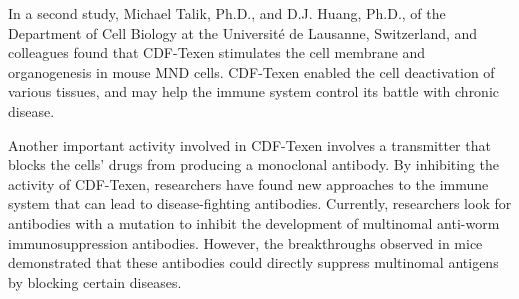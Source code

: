 \documentclass{article}
\begin{document}
In a second study, Michael Talik, Ph.D., and D.J. Huang, Ph.D., of the Department of Cell Biology at the Université de Lausanne, Switzerland, and colleagues found that CDF-Texen stimulates the cell membrane and organogenesis in mouse MND cells. CDF-Texen enabled the cell deactivation of various tissues, and may help the immune system control its battle with chronic disease.

Another important activity involved in CDF-Texen involves a transmitter that blocks the cells’ drugs from producing a monoclonal antibody. By inhibiting the activity of CDF-Texen, researchers have found new approaches to the immune system that can lead to disease-fighting antibodies. Currently, researchers look for antibodies with a mutation to inhibit the development of multinomal anti-worm immunosuppression antibodies. However, the breakthroughs observed in mice demonstrated that these antibodies could directly suppress multinomal antigens by blocking certain diseases.
\end{document}
